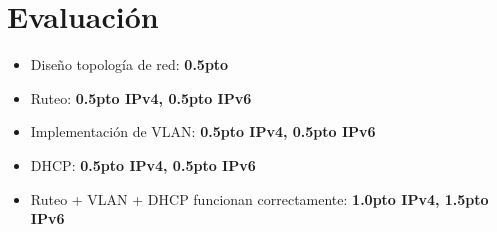 \documentclass[11pt]{utalcaDoc}
\begin{document}
\section{Evaluación}
\begin{itemize}
    \item{Diseño topología de red: \textbf{0.5pto}}
    \item{Ruteo: \textbf{0.5pto IPv4, 0.5pto IPv6}}
    \item{Implementación de VLAN: \textbf{0.5pto IPv4, 0.5pto IPv6}}
    \item{DHCP: \textbf{0.5pto IPv4, 0.5pto IPv6}}
    \item{Ruteo + VLAN + DHCP funcionan correctamente: \textbf{1.0pto IPv4, 1.5pto IPv6}}
\end{itemize}
\end{document}
